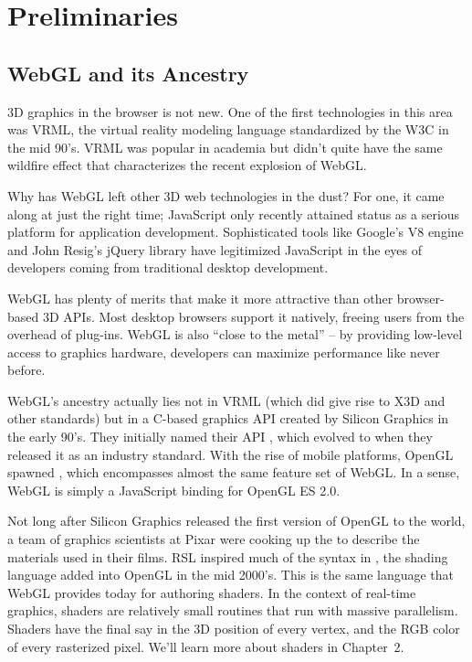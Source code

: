 \chapter{Preliminaries}%
\label{ch1}

\section{WebGL and its Ancestry}

3D graphics in the browser is not new.  One of the first technologies in this area was  VRML, the virtual reality modeling language standardized by the W3C in the mid 90's.  VRML was popular in academia but didn't quite have the same wildfire effect that characterizes the recent explosion of WebGL.

Why has WebGL left other 3D web technologies in the dust?  For one, it came along at just the right time; JavaScript only recently attained status as a serious platform for application development.  Sophisticated tools like Google's V8  engine  and John Resig's jQuery  library have legitimized JavaScript in the eyes of developers coming from traditional desktop development.

WebGL has plenty of merits that make it more attractive than other browser-based 3D APIs.  Most desktop browsers support it natively, freeing users from the overhead of plug-ins.  WebGL is also ``close to the metal'' -- by providing low-level access to graphics hardware, developers can maximize performance like never before.

WebGL's ancestry actually lies not in VRML (which did give rise to X3D and other standards) but in a C-based graphics API created by Silicon Graphics in the early 90's.  They initially named their API , which evolved to  when they released it as an industry standard.   With the rise of mobile platforms, OpenGL spawned , which encompasses almost the same feature set of WebGL.  In a sense, WebGL is simply a JavaScript binding for OpenGL ES 2.0.

Not long after Silicon Graphics released the first version of OpenGL to the world, a team of graphics scientists at Pixar were cooking up the  to describe the materials used in their films.  RSL inspired much of the syntax in , the shading language added into OpenGL in the mid 2000's.  This is the same language that WebGL provides today for authoring shaders.  In the context of real-time graphics,  shaders are relatively small routines that run with massive parallelism.  Shaders have the final say in the 3D position of every vertex, and the RGB color of every rasterized pixel.  We'll learn more about shaders in Chapter~2.

